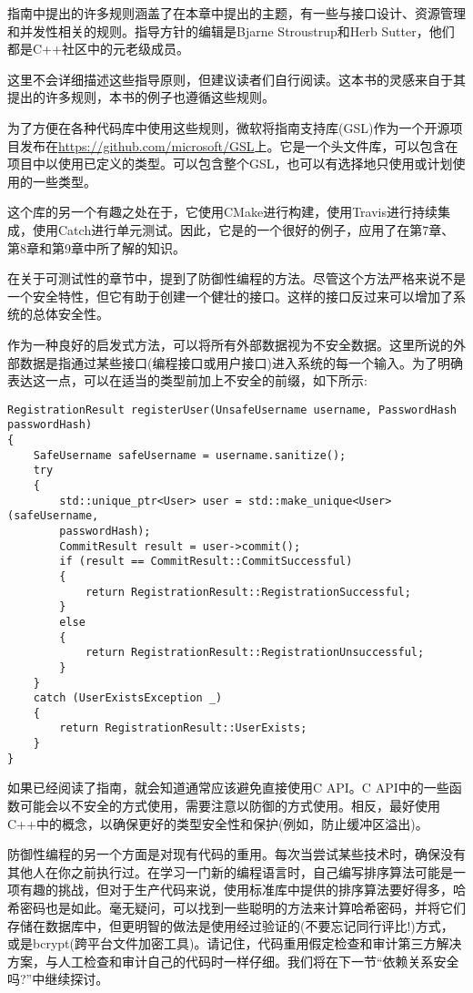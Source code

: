 指南中提出的许多规则涵盖了在本章中提出的主题，有一些与接口设计、资源管理和并发性相关的规则。指导方针的编辑是Bjarne Stroustrup和Herb Sutter，他们都是C++社区中的元老级成员。

这里不会详细描述这些指导原则，但建议读者们自行阅读。这本书的灵感来自于其提出的许多规则，本书的例子也遵循这些规则。

为了方便在各种代码库中使用这些规则，微软将指南支持库(GSL)作为一个开源项目发布在\url{https://github.com/microsoft/GSL}上。它是一个头文件库，可以包含在项目中以使用已定义的类型。可以包含整个GSL，也可以有选择地只使用或计划使用的一些类型。

这个库的另一个有趣之处在于，它使用CMake进行构建，使用Travis进行持续集成，使用Catch进行单元测试。因此，它是的一个很好的例子，应用了在第7章、第8章和第9章中所了解的知识。


在关于可测试性的章节中，提到了防御性编程的方法。尽管这个方法严格来说不是一个安全特性，但它有助于创建一个健壮的接口。这样的接口反过来可以增加了系统的总体安全性。

作为一种良好的启发式方法，可以将所有外部数据视为不安全数据。这里所说的外部数据是指通过某些接口(编程接口或用户接口)进入系统的每一个输入。为了明确表达这一点，可以在适当的类型前加上不安全的前缀，如下所示:

\begin{lstlisting}[style=styleCXX]
RegistrationResult registerUser(UnsafeUsername username, PasswordHash
passwordHash)
{
	SafeUsername safeUsername = username.sanitize();
	try
	{
		std::unique_ptr<User> user = std::make_unique<User>(safeUsername,
		passwordHash);
		CommitResult result = user->commit();
		if (result == CommitResult::CommitSuccessful)
		{
			return RegistrationResult::RegistrationSuccessful;
		}
		else
		{
			return RegistrationResult::RegistrationUnsuccessful;
		}
	}
	catch (UserExistsException _)
	{
		return RegistrationResult::UserExists;
	}
}
\end{lstlisting}

如果已经阅读了指南，就会知道通常应该避免直接使用C API。C API中的一些函数可能会以不安全的方式使用，需要注意以防御的方式使用。相反，最好使用C++中的概念，以确保更好的类型安全性和保护(例如，防止缓冲区溢出)。

防御性编程的另一个方面是对现有代码的重用。每次当尝试某些技术时，确保没有其他人在你之前执行过。在学习一门新的编程语言时，自己编写排序算法可能是一项有趣的挑战，但对于生产代码来说，使用标准库中提供的排序算法要好得多，哈希密码也是如此。毫无疑问，可以找到一些聪明的方法来计算哈希密码，并将它们存储在数据库中，但更明智的做法是使用经过验证的(不要忘记同行评比!)方式，或是bcrypt(跨平台文件加密工具)。请记住，代码重用假定检查和审计第三方解决方案，与人工检查和审计自己的代码时一样仔细。我们将在下一节“依赖关系安全吗?”中继续探讨。

